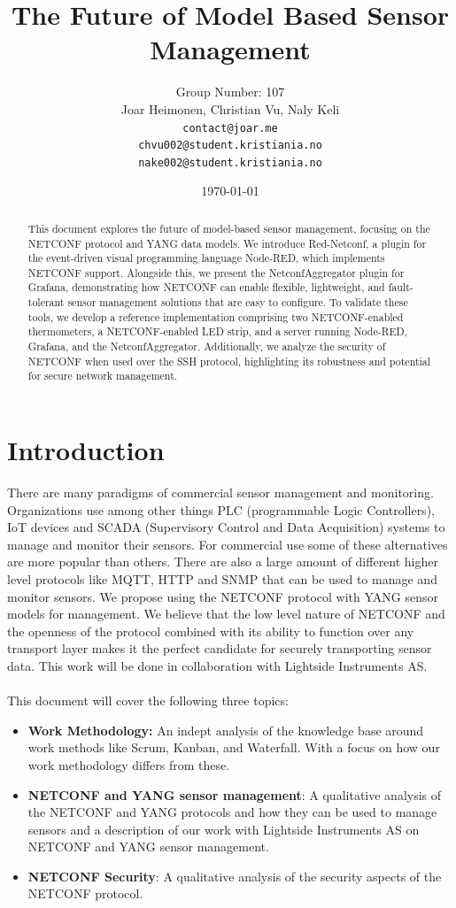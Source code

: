 \documentclass[12pt]{article}
\author{
    Group Number: 107\\
    Joar Heimonen, Christian Vu, Naly Keli \\
    \texttt{contact@joar.me}\\ 
    \texttt{chvu002@student.kristiania.no}\\
    \texttt{nake002@student.kristiania.no}
}
\title{
  \textbf{The Future of Model Based Sensor Management}\\
}
\date{\today}
\begin{document}
\maketitle

\begin{abstract}
  This document explores the future of model-based sensor management, focusing on the NETCONF protocol and YANG data models. We introduce Red-Netconf,
  a plugin for the event-driven visual programming language Node-RED, which implements NETCONF support. Alongside this, we present the NetconfAggregator 
  plugin for Grafana, demonstrating how NETCONF can enable flexible, lightweight, and fault-tolerant sensor management solutions that are easy to configure.
  To validate these tools, we develop a reference implementation comprising two NETCONF-enabled thermometers, a NETCONF-enabled LED strip, and a server 
  running Node-RED, Grafana, and the NetconfAggregator. Additionally, we analyze the security of NETCONF when used over the SSH protocol, 
  highlighting its robustness and potential for secure network management.
\end{abstract}

\pagebreak

\tableofcontents

\pagebreak


\section{Introduction}
There are many paradigms of commercial sensor management and monitoring. Organizations use among other things
PLC (programmable Logic Controllers), IoT devices and SCADA (Supervisory Control and Data Acquisition) systems to 
manage and monitor their sensors. For commercial use 
some of these alternatives are more popular than others. There are also a large amount of different higher level protocols
like MQTT, HTTP and SNMP that can be used to manage and monitor sensors. We propose using the NETCONF protocol 
with YANG sensor models for management. We believe that the low level nature of NETCONF and the openness of the protocol combined with 
its ability to function over any transport layer makes it the perfect candidate for securely transporting sensor data.
This work will be done in collaboration with Lightside Instruments AS.
\\
\\
This document will cover the following three topics:
\begin{itemize}
  \item \textbf{Work Methodology:} An indept analysis of the knowledge base around work methods like Scrum, Kanban, and Waterfall. 
  With a focus on how our work methodology differs from these.
  \item \textbf{NETCONF and YANG sensor management}: A qualitative analysis of the NETCONF and YANG protocols and how they can be used to manage sensors and 
  a description of our work with Lightside Instruments AS on NETCONF and YANG sensor management.
  \item \textbf{NETCONF Security}: A qualitative analysis of the security aspects of the NETCONF protocol.
\end{itemize}
\end{document}
